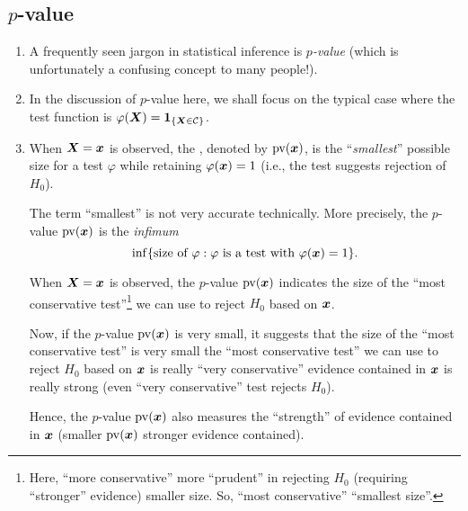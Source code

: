\subsection{\(p\)-value}
\begin{enumerate}
\item A frequently seen jargon in statistical inference is \emph{\(p\)-value}
(which is unfortunately a confusing concept to many people!).

\item In the  discussion of \(p\)-value here, we shall focus on the typical
case where the test function is
\(\varphi(\vb*{X})=\mathbf{1}_{\left\{\vb*{X}\in\mathcal{C}\right\}}\).

\item When \(\vb*{X}=\vb*{x}\) is observed, the , denoted
by \(\operatorname{pv}(\vb*{x})\), is the ``\emph{smallest}'' possible size for a test
\(\varphi\) while retaining \(\varphi(\vb*{x})=1\) (i.e., the test suggests
rejection of \(H_0\)).

\begin{note}
The term ``smallest'' is not very accurate technically. More precisely, the
\(p\)-value \(\operatorname{pv}(\vb*{x})\) is the \emph{infimum}
\[
\inf\{\text{size of \(\varphi\)}:\text{\(\varphi\) is a test with \(\varphi(\vb*{x})=1\)}\}.
\]
\end{note}

\begin{intuition}
When \(\vb*{X}=\vb*{x}\) is observed, the \(p\)-value
\(\operatorname{pv}(\vb*{x})\) indicates the size of the ``most conservative
test''\footnote{Here, ``more conservative''  more
``prudent'' in rejecting \(H_0\) (requiring ``stronger'' evidence)
 smaller size. So, ``most conservative''
 ``smallest size''.} we can use to reject \(H_0\) based on
\(\vb*{x}\).

Now, if the \(p\)-value \(\operatorname{pv}(\vb*{x})\) is very small, it
suggests that the size of the ``most conservative test'' is very small
 the ``most conservative test'' we can use to reject
\(H_0\) based on \(\vb*{x}\) is really ``very conservative''
 evidence contained in \(\vb*{x}\) is really strong (even
``very conservative'' test rejects \(H_0\)).

Hence, the \(p\)-value \(\operatorname{pv}(\vb*{x})\) also measures the
``strength'' of evidence contained in \(\vb*{x}\) (smaller
\(\operatorname{pv}(\vb*{x})\)  stronger evidence
contained).
\end{intuition}


\end{enumerate}
